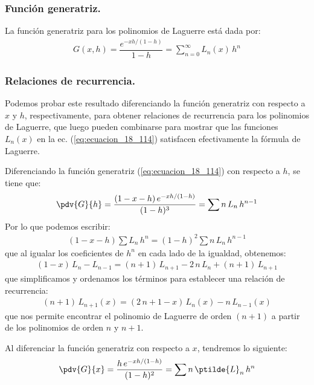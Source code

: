 \subsubsection{Función generatriz.}
La función generatriz para los polinomios de Laguerre está dada por:
\begin{align}
G(x, h) = \dfrac{e^{-xh/(1-h)}}{1- h} = \sum_{n=0}^{\infty} L_{n} (x) \, h^{n}
\label{eq:ecuacion_18_114}
\end{align}
\subsubsection{Relaciones de recurrencia.}

Podemos probar este resultado diferenciando la función generatriz con respecto a $x$ y $h$, respectivamente, para obtener relaciones de recurrencia para los polinomios de Laguerre, que luego pueden combinarse para mostrar que las funciones $L_{n} (x)$ en la ec. (\ref{eq:ecuacion_18_114}) satisfacen efectivamente la fórmula de Laguerre.
\par
Diferenciando la función generatriz (\ref{eq:ecuacion_18_114}) con respecto a $h$, se tiene que:
\begin{align*}
\pdv{G}{h} = \dfrac{(1 - x -h) \, e^{-xh/(1-h)}}{(1- h )^{3}} = \sum n \, L_{n} \, h^{n-1}
\end{align*}
Por lo que podemos escribir:
\begin{align*}
(1 - x - h) \sum L_{n} \, h^{n} = (1 - h)^{2} \sum n \, L_{n} \, h^{n-1}
\end{align*}
que al igualar los coeficientes de $h^{n}$ en cada lado de la igualdad, obtenemos:
\begin{align*}
(1 - x) \, L_{n} - L_{n-1} = (n + 1) \, L_{n+1} - 2 \, n \, L_{n} + (n + 1) \, L_{n+1}
\end{align*}
que simplificamos y ordenamos los términos para establecer una relación de recurrencia:
\begin{align}
(n + 1) \, L_{n+1} (x) = (2 \, n + 1 - x) \, L_{n}(x) - n \, L_{n-1} (x)
\label{eq:ecuacion_18_115}
\end{align}
que nos permite encontrar el polinomio de Laguerre de orden $(n+1)$ a partir de los polinomios de orden $n$ y $n+1$.
\par
Al diferenciar la función generatriz con respecto a $x$, tendremos lo siguiente:
\begin{align*}
\pdv{G}{x} = \dfrac{h \, e^{-xh/(1-h)}}{(1 - h)^{2}} = \sum n \, \ptilde{L}_{n} \, h^{n}
\end{align*}
